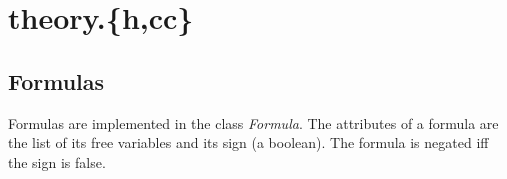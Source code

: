 \documentclass{article}
\begin{document}
\section{theory.\{h,cc\}}

\subsection*{Formulas}

Formulas are implemented in the class \emph{Formula}. The attributes of a formula are the list of its free variables and its sign (a boolean). The formula is negated iff the sign is false.
\end{document}
